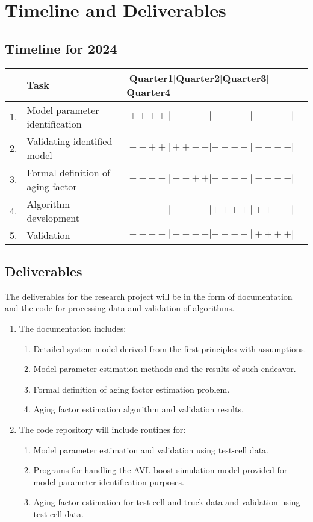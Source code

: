 \section{Timeline and Deliverables}
\subsection{Timeline for 2024}

\begin{table}[H]
    \centering
    \begin{tabular}{l l l}
        \hline\hline
                & Task & $|$Quarter1$|$Quarter2$|$Quarter3$|$Quarter4$|$ \\\hline\hline
        1.      & Model parameter identification   & $|++++|----|----|----|$\\
        2.      & Validating identified model      & $|--++|++--|----|----|$\\
        3.      & Formal definition of aging factor& $|----|--++|----|----|$\\
        4.      & Algorithm development            & $|----|----|++++|++--|$\\
        5.      & Validation                       & $|----|----|----|++++|$\\
        \hline\hline
    \end{tabular}
\end{table}
\subsection{Deliverables}
The deliverables for the research project will be in the form of documentation
and the code for processing data and validation of algorithms.

\begin{enumerate}
    \item The documentation includes:
\begin{enumerate}
    \item Detailed system model derived from the first principles with assumptions.
    \item Model parameter estimation methods and the results of such endeavor.
    \item Formal definition of aging factor estimation problem.
    \item Aging factor estimation algorithm and validation results.
\end{enumerate}

\item The code repository will include routines for:
\begin{enumerate}
    \item Model parameter estimation and validation using test-cell data.
\item Programs for handling the AVL boost simulation model provided for model
parameter identification purposes.
\item Aging factor estimation for test-cell and truck data and validation using
test-cell data.
\end{enumerate}

\end{enumerate}
